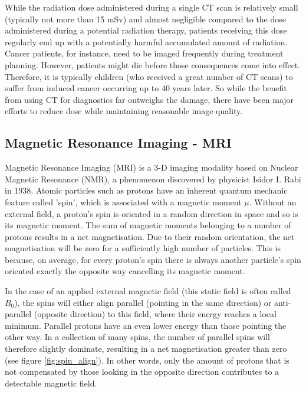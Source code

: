 While the radiation dose administered during a single CT scan is relatively small (typically not more than 15 mSv) and almost negligible compared to the dose administered during a potential radiation therapy, patients receiving this dose regularly end up with a potentially harmful accumulated amount of radiation.
Cancer patients, for instance, need to be imaged frequently during treatment planning.
However, patients might die before those consequences come into effect.
Therefore, it is typically children (who received a great number of CT scans) to suffer from induced cancer occurring up to 40 years later.
So while the benefit from using CT for diagnostics far outweighs the damage, there have been major efforts to reduce dose while maintaining reasonable image quality.
\cite{Sodickson2009, McCollough2009, Murphy2007, Smith2007, Goldman2013, Brenner2001}


\subsection{Magnetic Resonance Imaging - MRI}
\label{sec:MRI}
Magnetic Resonance Imaging (MRI) is a 3-D imaging modality based on Nuclear Magnetic Resonance (NMR), a phenomenon discovered by physicist Isidor I. Rabi in 1938.
Atomic particles such as protons have an inherent quantum mechanic feature called 'spin', which is associated with a magnetic moment $\mu$.
Without an external field, a proton's spin is oriented in a random direction in space and so is its magnetic moment.
The sum of magnetic moments belonging to a number of protons results in a net magnetisation.
Due to their random orientation, the net magnetisation will be zero for a sufficiently high number of particles.
This is because, on average, for every proton's spin there is always another particle's spin oriented exactly the opposite way cancelling its magnetic moment.

In the case of an applied external magnetic field (this static field is often called $B_0$), the spins will either align parallel (pointing in the same direction) or anti-parallel (opposite direction) to this field, where their energy reaches a local minimum.
Parallel protons have an even lower energy than those pointing the other way.
In a collection of many spins, the number of parallel spins will therefore slightly dominate, resulting in a net magnetisation greater than zero (see figure \ref{fig:spin_align}).
In other words, only the amount of protons that is not compensated by those looking in the opposite direction contributes to a detectable magnetic field.

